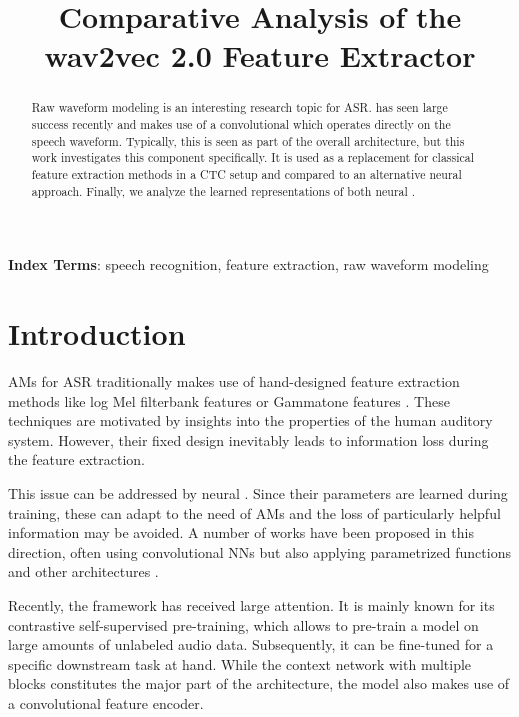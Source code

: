 \documentclass{INTERSPEECH2023}
\title{Comparative Analysis of the wav2vec 2.0 Feature Extractor}
\begin{document}
\maketitle
 
\begin{abstract}
Raw waveform modeling is an interesting research topic for \gls{ASR}.
\wvtwo has seen large success recently and makes use of a convolutional \fe which operates directly on the speech waveform.
Typically, this \fe is seen as part of the overall architecture, but this work investigates this component specifically.
It is used as a replacement for classical feature extraction methods in a \gls{CTC} setup and compared to an alternative neural \fe approach.
Finally, we analyze the learned representations of both neural \fes.
\end{abstract}
\noindent\textbf{Index Terms}: speech recognition, feature extraction, raw waveform modeling


\section{Introduction}
\glspl{AM} for \gls{ASR} traditionally makes use of hand-designed feature extraction methods like log Mel filterbank features \addref or Gammatone features \cite{schlueter:icassp07}.
These techniques are motivated by insights into the properties of the human auditory system.
However, their fixed design inevitably leads to information loss during the feature extraction.

This issue can be addressed by neural \fes.
Since their parameters are learned during training, these \fes can adapt to the need of \glspl{AM} and the loss of particularly helpful information may be avoided.
A number of works have been proposed in this direction, often using convolutional \glspl{NN} \addref but also applying parametrized functions \cite{ravanelli2018sincnet} and other architectures \cite{sainath2015cldnn}.

Recently, the \wvtwo framework \cite{facebook2020wav2vec2} has received large attention.
It is mainly known for its contrastive self-supervised pre-training, which allows to pre-train a model on large amounts of unlabeled audio data.
Subsequently, it can be fine-tuned for a specific downstream task at hand.
While the context network with multiple \transformer blocks constitutes the major part of the architecture, the \wvtwo model also makes use of a convolutional feature encoder.
\end{document}

